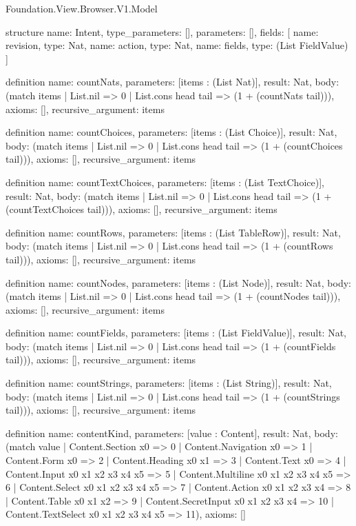 \begin{lexlean}{Foundation.View.Browser.V1.Model}
\begin{semanticmodule}
structure{
  name: Intent,
  type_parameters: [],
  parameters: [],
  fields: [
    {name: revision, type: Nat},
    {name: action, type: Nat},
    {name: fields, type: (List FieldValue)}
  ]
}

definition{
  name: countNats,
  parameters: [items : (List Nat)],
  result: Nat,
  body: (match items | List.nil => 0 | List.cons head tail => (1 + (countNats tail))),
  axioms: [],
  recursive_argument: items
}

definition{
  name: countChoices,
  parameters: [items : (List Choice)],
  result: Nat,
  body: (match items | List.nil => 0 | List.cons head tail => (1 + (countChoices tail))),
  axioms: [],
  recursive_argument: items
}

definition{
  name: countTextChoices,
  parameters: [items : (List TextChoice)],
  result: Nat,
  body: (match items | List.nil => 0 | List.cons head tail => (1 + (countTextChoices tail))),
  axioms: [],
  recursive_argument: items
}

definition{
  name: countRows,
  parameters: [items : (List TableRow)],
  result: Nat,
  body: (match items | List.nil => 0 | List.cons head tail => (1 + (countRows tail))),
  axioms: [],
  recursive_argument: items
}

definition{
  name: countNodes,
  parameters: [items : (List Node)],
  result: Nat,
  body: (match items | List.nil => 0 | List.cons head tail => (1 + (countNodes tail))),
  axioms: [],
  recursive_argument: items
}

definition{
  name: countFields,
  parameters: [items : (List FieldValue)],
  result: Nat,
  body: (match items | List.nil => 0 | List.cons head tail => (1 + (countFields tail))),
  axioms: [],
  recursive_argument: items
}

definition{
  name: countStrings,
  parameters: [items : (List String)],
  result: Nat,
  body: (match items | List.nil => 0 | List.cons head tail => (1 + (countStrings tail))),
  axioms: [],
  recursive_argument: items
}

definition{
  name: contentKind,
  parameters: [value : Content],
  result: Nat,
  body: (match value
    | Content.Section x0 => 0
    | Content.Navigation x0 => 1
    | Content.Form x0 => 2
    | Content.Heading x0 x1 => 3
    | Content.Text x0 => 4
    | Content.Input x0 x1 x2 x3 x4 x5 => 5
    | Content.Multiline x0 x1 x2 x3 x4 x5 => 6
    | Content.Select x0 x1 x2 x3 x4 x5 => 7
    | Content.Action x0 x1 x2 x3 x4 => 8
    | Content.Table x0 x1 x2 => 9
    | Content.SecretInput x0 x1 x2 x3 x4 => 10
    | Content.TextSelect x0 x1 x2 x3 x4 x5 => 11),
  axioms: []
}


\end{semanticmodule}
\end{lexlean}
